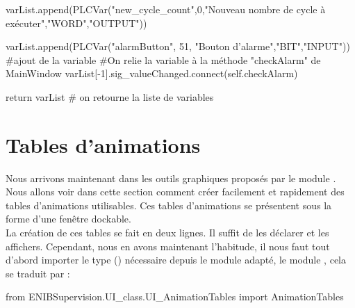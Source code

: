 {\begin{Python}
	varList.append(PLCVar("new_cycle_count",0,"Nouveau nombre de cycle à exécuter","WORD","OUTPUT"))

	varList.append(PLCVar("alarmButton", 51, "Bouton d'alarme","BIT","INPUT")) #ajout de la variable
	#On relie la variable à la méthode "checkAlarm" de MainWindow
	varList[-1].sig_valueChanged.connect(self.checkAlarm)

	return varList  # on retourne la liste de variables
\end{Python}


\section{Tables d'animations}

Nous arrivons maintenant dans les outils graphiques proposés par le module .\newline
Nous allons voir dans cette section comment créer facilement et rapidement des tables d'animations utilisables.\newline
Ces tables d'animations se présentent sous la forme d'une fenêtre dockable.\\

La création de ces tables se fait en deux lignes. Il suffit de les déclarer et les affichers.\newline
Cependant, nous en avons maintenant l'habitude, il nous faut tout d'abord importer le type () nécessaire depuis le module adapté, le module , cela se traduit par :
\begin{Python}
from ENIBSupervision.UI_class.UI_AnimationTables import AnimationTables
\end{Python}


}

